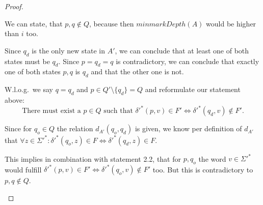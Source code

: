 \documentclass[a4paper, oneside, 11pt]{report}
\newtheorem{lemma}{Lemma}
\theoremstyle{definition}
\theoremstyle{remark}
\begin{document}
\begin{proof}
\begin{description}
		
		We can state, that $p, q \notin Q$, because then $minmarkDepth(A)$ would be higher than $i$ too. 
		
		Since $q_d$ is the only new state in $A'$, we can conclude that at least one of both states must be $q_d$. Since $p = q_d = q$ is contradictory, we can conclude that exactly one of both states $p, q$ is $q_d$ and that the other one is not.
		
		W.l.o.g.\ we say $q = q_d$ and $p \in Q' \setminus \{q_d\} = Q$ and reformulate our statement above:
		\begin{equation}
		\text{There must exist a }p \in Q\text{ such that }\delta'^*(p,v) \in F' \Leftrightarrow \delta'^*(q_d,v) \notin F'.
		\end{equation}
		
		
		Since for $q_o \in Q$ the relation $d_{A'}(q_o, q_d)$ is given, we know per definition of $d_{A'}$ that $\forall z\in\Sigma'^*\colon \delta'^*(q_o,z) \in F \Leftrightarrow \delta'^*(q_d,z) \in F$.
		
		This implies in combination with statement 2.2, that for $p,q_o$ the word $v\in\Sigma'^*$ would fulfill $\delta'^*(p,v) \in F' \Leftrightarrow \delta'^*(q_o,v) \notin F'$ too. But this is contradictory to $p,q \notin Q$.
		
	\end{description}
\end{proof}

%
\end{document}
